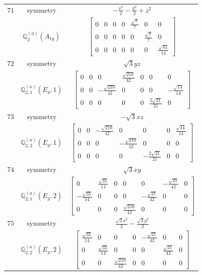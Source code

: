 \documentclass[fleqn,8pt,landscape]{jsarticle}
\begin{document}
\begin{longtable}{ccc}
$ 71 $ & $ \text{symmetry} $ & $ - \frac{x^{2}}{2} - \frac{y^{2}}{2} + z^{2} $ \\
$  $ & $ \mathbb{Q}_{2}^{(a)}(A_{1g}) $ & $ \begin{bmatrix} 0 & 0 & 0 & 0 & \frac{\sqrt{7}}{7} & 0 & 0 \\ 0 & 0 & 0 & 0 & 0 & \frac{\sqrt{7}}{7} & 0 \\ 0 & 0 & 0 & 0 & 0 & 0 & \frac{\sqrt{42}}{14} \end{bmatrix} $ \\ \hline
$ 72 $ & $ \text{symmetry} $ & $ \sqrt{3} y z $ \\
$  $ & $ \mathbb{Q}_{2,1}^{(a)}(E_{g},1) $ & $ \begin{bmatrix} 0 & 0 & 0 & \frac{\sqrt{210}}{42} & 0 & 0 & 0 \\ 0 & 0 & - \frac{\sqrt{210}}{42} & 0 & 0 & 0 & - \frac{\sqrt{14}}{14} \\ 0 & 0 & 0 & 0 & 0 & \frac{2 \sqrt{21}}{21} & 0 \end{bmatrix} $ \\ \hline
$ 73 $ & $ \text{symmetry} $ & $ - \sqrt{3} x z $ \\
$  $ & $ \mathbb{Q}_{2,2}^{(a)}(E_{g},1) $ & $ \begin{bmatrix} 0 & 0 & - \frac{\sqrt{210}}{42} & 0 & 0 & 0 & \frac{\sqrt{14}}{14} \\ 0 & 0 & 0 & - \frac{\sqrt{210}}{42} & 0 & 0 & 0 \\ 0 & 0 & 0 & 0 & - \frac{2 \sqrt{21}}{21} & 0 & 0 \end{bmatrix} $ \\ \hline
$ 74 $ & $ \text{symmetry} $ & $ \sqrt{3} x y $ \\
$  $ & $ \mathbb{Q}_{2,1}^{(a)}(E_{g},2) $ & $ \begin{bmatrix} 0 & \frac{\sqrt{35}}{14} & 0 & 0 & 0 & - \frac{\sqrt{21}}{42} & 0 \\ - \frac{\sqrt{35}}{14} & 0 & 0 & 0 & - \frac{\sqrt{21}}{42} & 0 & 0 \\ 0 & 0 & 0 & \frac{\sqrt{210}}{42} & 0 & 0 & 0 \end{bmatrix} $ \\ \hline
$ 75 $ & $ \text{symmetry} $ & $ \frac{\sqrt{3} x^{2}}{2} - \frac{\sqrt{3} y^{2}}{2} $ \\
$  $ & $ \mathbb{Q}_{2,2}^{(a)}(E_{g},2) $ & $ \begin{bmatrix} \frac{\sqrt{35}}{14} & 0 & 0 & 0 & - \frac{\sqrt{21}}{42} & 0 & 0 \\ 0 & \frac{\sqrt{35}}{14} & 0 & 0 & 0 & \frac{\sqrt{21}}{42} & 0 \\ 0 & 0 & \frac{\sqrt{210}}{42} & 0 & 0 & 0 & 0 \end{bmatrix} $ \\ \hline

\end{longtable}
\end{document}

